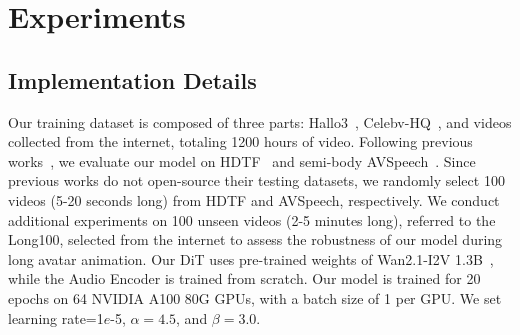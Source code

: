 \section{Experiments}
\label{sec:experiments}

\subsection{Implementation Details}
Our training dataset is composed of three parts: Hallo3~\cite{cui2025hallo3}, Celebv-HQ~\cite{zhu2022celebvhq}, and videos collected from the internet, totaling 1200 hours of video.
Following previous works~\cite{wang2025fantasytalking,cui2025hallo3,kong2025let,gan2025omniavatar}, we evaluate our model on HDTF~\cite{zhang2021flow} and semi-body AVSpeech~\cite{ephrat2018looking}. 
Since previous works do not open-source their testing datasets, we randomly select 100 videos (5-20 seconds long) from HDTF and AVSpeech, respectively.
We conduct additional experiments on 100 unseen videos (2-5 minutes long), referred to the Long100, selected from the internet to assess the robustness of our model during long avatar animation.
Our DiT uses pre-trained weights of Wan2.1-I2V 1.3B~\cite{wan2025, liu2025phantom}, while the Audio Encoder is trained from scratch. 
Our model is trained for 20 epochs on 64 NVIDIA A100 80G GPUs, with a batch size of 1 per GPU. 
We set learning rate=1$e$-5, $\alpha=4.5$, and $\beta=3.0$.

